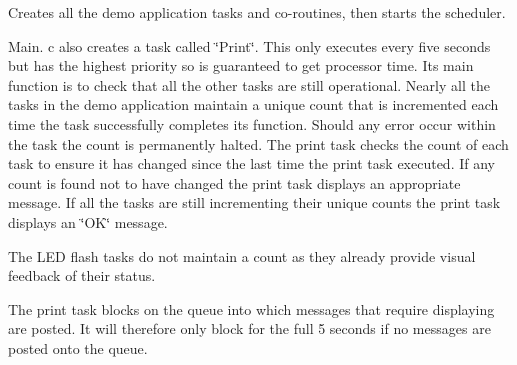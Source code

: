Creates all the demo application tasks and co-\/routines, then starts the scheduler.

Main. c also creates a task called \char`\"{}\+Print\char`\"{}. This only executes every five seconds but has the highest priority so is guaranteed to get processor time. Its main function is to check that all the other tasks are still operational. Nearly all the tasks in the demo application maintain a unique count that is incremented each time the task successfully completes its function. Should any error occur within the task the count is permanently halted. The print task checks the count of each task to ensure it has changed since the last time the print task executed. If any count is found not to have changed the print task displays an appropriate message. If all the tasks are still incrementing their unique counts the print task displays an \char`\"{}\+O\+K\char`\"{} message.

The L\+ED flash tasks do not maintain a count as they already provide visual feedback of their status.

The print task blocks on the queue into which messages that require displaying are posted. It will therefore only block for the full 5 seconds if no messages are posted onto the queue.



 